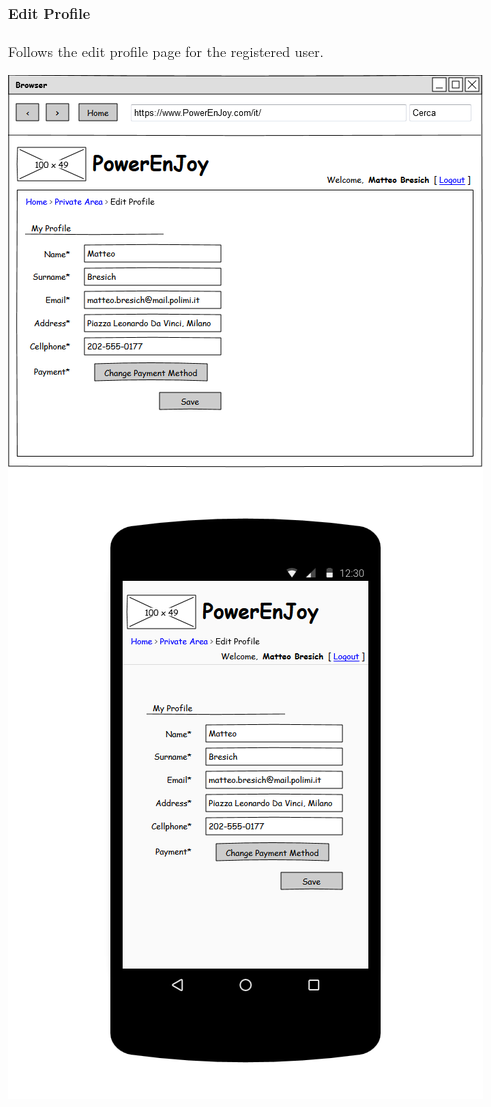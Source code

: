 \paragraph{Edit Profile} Follows the edit profile page for the registered user.
\begin{center}
	\includegraphics[width=0.6\linewidth]{"img/ui/edit-profile"}
\end{center}
\pagebreak